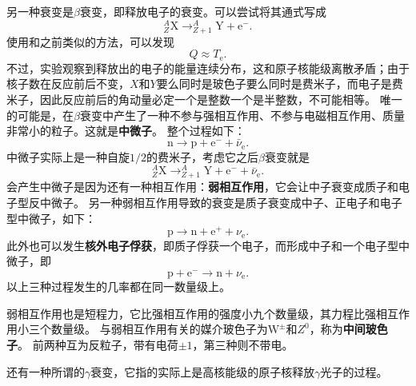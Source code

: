\documentclass[UTF8, a4paper]{ctexart}
\newcommand*{\nuclear}[3]{^{#2}_{#3}\text{#1}}
\begin{document}
另一种衰变是$\beta$衰变，即释放电子的衰变。可以尝试将其通式写成
\[
    \nuclear{X}{A}{Z} \longrightarrow \nuclear{Y}{A}{Z+1} + \text{e}^-.
\]
使用和之前类似的方法，可以发现
\begin{equation}
    Q \approx T_\text{e}.
\end{equation}
不过，实验观察到释放出的电子的能量连续分布，这和原子核能级离散矛盾；由于核子数在反应前后不变，$X$和$Y$要么同时是玻色子要么同时是费米子，而电子是费米子，因此反应前后的角动量必定一个是整数一个是半整数，不可能相等。
唯一的可能是，在$\beta$衰变中产生了一种不参与强相互作用、不参与电磁相互作用、质量非常小的粒子。这就是\textbf{中微子}。
整个过程如下：
\[
    \text{n} \longrightarrow \text{p} + \text{e}^- + \bar{\nu}_\text{e}.
\]
中微子实际上是一种自旋$1/2$的费米子，考虑它之后$\beta$衰变就是
\[
    \nuclear{X}{A}{Z} \longrightarrow \nuclear{Y}{A}{Z+1} + \text{e}^- + \bar{\nu}_\text{e}.
\]
会产生中微子是因为还有一种相互作用：\textbf{弱相互作用}，它会让中子衰变成质子和电子型反中微子。
另一种弱相互作用导致的衰变是质子衰变成中子、正电子和电子型中微子，如下：
\[
    \text{p} \longrightarrow \text{n} + \text{e}^+ + \nu_\text{e}.
\]
此外也可以发生\textbf{核外电子俘获}，即质子俘获一个电子，而形成中子和一个电子型中微子，即
\[
    \text{p} + \text{e}^- \longrightarrow \text{n} + \nu_\text{e}.
\]
以上三种过程发生的几率都在同一数量级上。

弱相互作用也是短程力，它比强相互作用的强度小九个数量级，其力程比强相互作用小三个数量级。
与弱相互作用有关的媒介玻色子为$\text{W}^\pm$和$Z^0$，称为\textbf{中间玻色子}。
前两种互为反粒子，带有电荷$\pm 1$，第三种则不带电。

还有一种所谓的$\gamma$衰变，它指的实际上是高核能级的原子核释放$\gamma$光子的过程。
\end{document}
